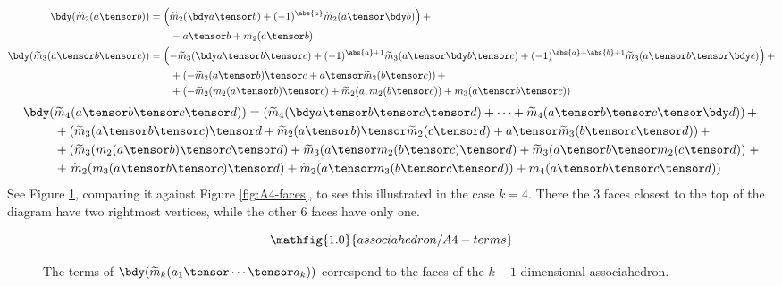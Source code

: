 \begin{align*}
\bdy(\tm_2(a \tensor b)) & = \left(\tm_2(\bdy a \tensor b) + (-1)^{\abs{a}} \tm_2(a \tensor \bdy b)\right) + \\
                         & \qquad - a \tensor b + m_2(a \tensor b) \\
\bdy(\tm_3(a \tensor b \tensor c)) & = \left(- \tm_3(\bdy a \tensor b \tensor c) + (-1)^{\abs{a} + 1} \tm_3(a \tensor \bdy b \tensor c) + (-1)^{\abs{a} + \abs{b} + 1} \tm_3(a \tensor b \tensor \bdy c)\right) + \\
                                   & \qquad + \left(- \tm_2(a \tensor b) \tensor c + a \tensor \tm_2(b \tensor c)\right) + \\
                                   & \qquad + \left(- \tm_2(m_2(a \tensor b) \tensor c) + \tm_2(a, m_2(b \tensor c)) + m_3(a \tensor b \tensor c)\right)
\end{align*}
\begin{align*}
\bdy(& \tm_4(a \tensor b \tensor c \tensor d)) = \left(\tm_4(\bdy a \tensor b \tensor c \tensor d) + \cdots + \tm_4(a \tensor b \tensor c \tensor \bdy d)\right) + \\
                                             & + \left(\tm_3(a \tensor b \tensor c) \tensor d + \tm_2(a \tensor b) \tensor \tm_2(c \tensor d) + a \tensor \tm_3(b \tensor c \tensor d)\right) + \\
                                             & + \left(\tm_3(m_2(a \tensor b) \tensor c \tensor d) + \tm_3(a \tensor m_2(b \tensor c) \tensor d) + \tm_3(a \tensor b \tensor m_2(c \tensor d))\right. + \\
                                             & + \left.\tm_2(m_3(a \tensor b \tensor c) \tensor d) + \tm_2(a \tensor m_3(b \tensor c \tensor d)) + m_4(a \tensor b \tensor c \tensor d)\right) \\
\end{align*}
See Figure \ref{fig:A4-terms}, comparing it against Figure \ref{fig:A4-faces}, to see this illustrated in the case $k=4$. There the $3$ faces closest
to the top of the diagram have two rightmost vertices, while the other $6$ faces have only one.

\begin{figure}[!ht]
\begin{equation*}
\mathfig{1.0}{associahedron/A4-terms}
\end{equation*}
\caption{The terms of $\bdy(\tm_k(a_1 \tensor \cdots \tensor a_k))$ correspond to the faces of the $k-1$ dimensional associahedron.}
\label{fig:A4-terms}
\end{figure}

